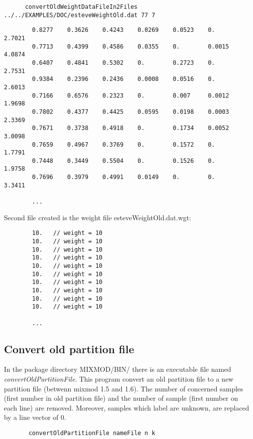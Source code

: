 {\scriptsize
\begin{verbatim}
      convertOldWeightDataFileIn2Files ../../EXAMPLES/DOC/esteveWeightOld.dat 77 7
\end{verbatim}}

{\scriptsize
\begin{verbatim}
        0.8277    0.3626    0.4243    0.0269    0.0523    0.        2.7021
        0.7713    0.4399    0.4586    0.0355    0.        0.0015    4.0874
        0.6407    0.4841    0.5302    0.        0.2723    0.        2.7531
        0.9384    0.2396    0.2436    0.0008    0.0516    0.        2.6013
        0.7166    0.6576    0.2323    0.        0.007     0.0012    1.9698
        0.7802    0.4377    0.4425    0.0595    0.0198    0.0003    2.3369
        0.7671    0.3738    0.4918    0.        0.1734    0.0052    3.0098
        0.7659    0.4967    0.3769    0.        0.1572    0.        1.7791
        0.7448    0.3449    0.5504    0.        0.1526    0.        1.9758
        0.7696    0.3979    0.4991    0.0149    0.        0.        3.3411

        ...
\end{verbatim}}

{\noindent Second file created is the weight file esteveWeightOld.dat.wgt:}
{\scriptsize
\begin{verbatim}
        10.   // weight = 10
        10.   // weight = 10
        10.   // weight = 10
        10.   // weight = 10
        10.   // weight = 10
        10.   // weight = 10
        10.   // weight = 10
        10.   // weight = 10
        10.   // weight = 10
        10.   // weight = 10

        ...
\end{verbatim}}


\subsection{ Convert old partition file}
In the package directory MIXMOD/BIN/ there is an executable file named {\em convertOldPartitionFile}. This
program convert an old partition file to a new partition file (betwenn {\sc mixmod} 1.5 and 1.6). The number of
concerned samples (first number in old partition file) and the number of sample (first number on each line) are
removed. Moreover, samples which label are unknown, are replaced by a line vector of 0.\\
{\scriptsize
\begin{verbatim}
       convertOldPartitionFile nameFile n k
\end{verbatim}}

